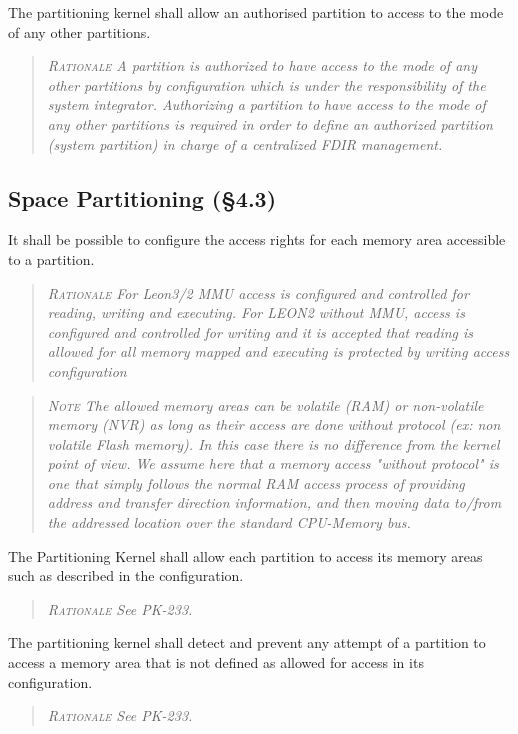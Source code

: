 The partitioning kernel shall allow an authorised partition to access to the mode of any other partitions.
\begin{quote}\it
\textsc{Rationale}
A partition is authorized to have access to the mode of any other partitions by configuration which is under the responsibility of the system integrator. Authorizing a partition to have access to the mode of any other partitions is required in order to define an authorized partition (system partition) in charge of a centralized FDIR management.
\end{quote}

\subsection{Space Partitioning (\S4.3)}

It shall be possible to configure the access rights for each memory area accessible to a partition.
\begin{quote}\it
\textsc{Rationale}
For Leon3/2 MMU access is configured and controlled for reading, writing and executing.  For LEON2 without MMU, access is configured and controlled for writing and it is accepted that reading is allowed for all memory mapped and executing is protected by writing access configuration
\end{quote}
\begin{quote}\it
\textsc{Note}
The allowed memory areas can be volatile (RAM) or non-volatile memory (NVR) as long as their access are done without protocol (ex: non volatile Flash memory). In this case there is no difference from the kernel point of view.
We assume here that a memory access "without protocol" is one that simply follows the normal RAM access process of providing address and transfer direction information, and then moving data to/from the addressed location over the standard CPU-Memory bus.
\end{quote}

The Partitioning Kernel shall allow each partition to access its memory areas such as described in the configuration.
\begin{quote}\it
\textsc{Rationale}
See PK-233.
\end{quote}

The partitioning kernel shall detect and prevent any attempt of a partition to access a memory area that is not defined as allowed for access in its configuration.
\begin{quote}\it
\textsc{Rationale}
See PK-233.
\end{quote}

